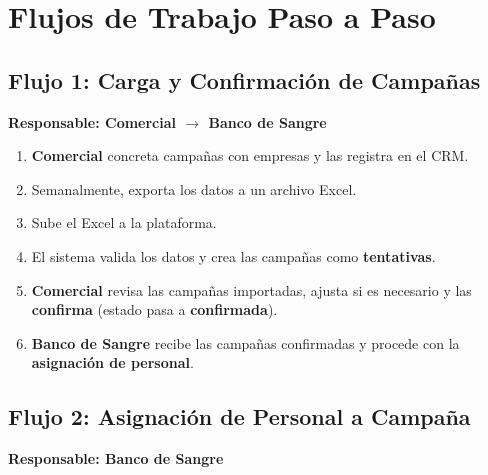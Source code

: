\documentclass[9pt,a4paper]{extarticle}
\begin{document}
\section{Flujos de Trabajo Paso a Paso}

\subsection{Flujo 1: Carga y Confirmaci\'{o}n de Campañas}

\textbf{Responsable: Comercial $\rightarrow$ Banco de Sangre}

\begin{enumerate}[leftmargin=2em]
    \item \textbf{Comercial} concreta campañas con empresas y las registra en el CRM.
    \item Semanalmente, exporta los datos a un archivo Excel.
    \item Sube el Excel a la plataforma.
    \item El sistema valida los datos y crea las campañas como \textbf{tentativas}.
    \item \textbf{Comercial} revisa las campañas importadas, ajusta si es necesario y las \textbf{confirma} (estado pasa a \textbf{confirmada}).
    \item \textbf{Banco de Sangre} recibe las campañas confirmadas y procede con la \textbf{asignaci\'{o}n de personal}.
\end{enumerate}

\subsection{Flujo 2: Asignaci\'{o}n de Personal a Campaña}

\textbf{Responsable: Banco de Sangre}
\end{document}
